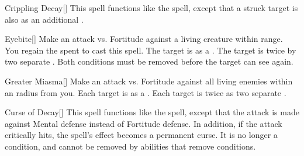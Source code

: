 \lowercase{\hypertarget{spell:Crippling Decay}{}}\label{spell:Crippling Decay}
\begin{apability}[\nth{3}]{\hypertarget{spell:Crippling Decay}{Crippling Decay}}[]
This spell functions like the  spell, except that a struck target is also  as an additional .
\end{apability}
\vspace{0.25em}



\lowercase{\hypertarget{spell:Eyebite}{}}\label{spell:Eyebite}
\begin{apability}[\nth{3}]{\hypertarget{spell:Eyebite}{Eyebite}}[]
Make an attack vs. Fortitude against a living creature within \rngclose range.
\miss You regain the  spent to cast this spell.
\hit The target is  as a .
\crit The target is  twice by two separate .
Both conditions must be removed before the target can see again.
\end{apability}
\vspace{0.25em}



\lowercase{\hypertarget{spell:Greater Miasma}{}}\label{spell:Greater Miasma}
\begin{apability}[\nth{3}]{\hypertarget{spell:Greater Miasma}{Greater Miasma}}[]
Make an attack vs. Fortitude against all living enemies within an \areamed radius from you.
\hit Each target is  as a .
\crit Each target is  twice as two separate .
\end{apability}
\vspace{0.25em}



\lowercase{\hypertarget{spell:Curse of Decay}{}}\label{spell:Curse of Decay}
\begin{apability}[\nth{4}]{\hypertarget{spell:Curse of Decay}{Curse of Decay}}[]
This spell functions like the  spell, except that the attack is made against Mental defense instead of Fortitude defense.
In addition, if the attack critically hits, the spell's effect becomes a permanent curse.
It is no longer a condition, and cannot be removed by abilities that remove conditions.
\end{apability}
\vspace{0.25em}



